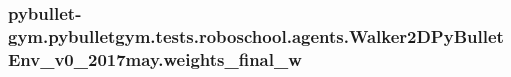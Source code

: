 \subsubsection[{\texorpdfstring{weights\+\_\+final\+\_\+w}{weights_final_w}}]{\setlength{\rightskip}{0pt plus 5cm}pybullet-\/gym.\+pybulletgym.\+tests.\+roboschool.\+agents.\+Walker2\+D\+Py\+Bullet\+Env\+\_\+v0\+\_\+2017may.\+weights\+\_\+final\+\_\+w}\hypertarget{namespacepybullet-gym_1_1pybulletgym_1_1tests_1_1roboschool_1_1agents_1_1_walker2_d_py_bullet_env__v0__2017may_a93d1b7d1ecec1a910a4387444f0a6d6a}{}\label{namespacepybullet-gym_1_1pybulletgym_1_1tests_1_1roboschool_1_1agents_1_1_walker2_d_py_bullet_env__v0__2017may_a93d1b7d1ecec1a910a4387444f0a6d6a}
